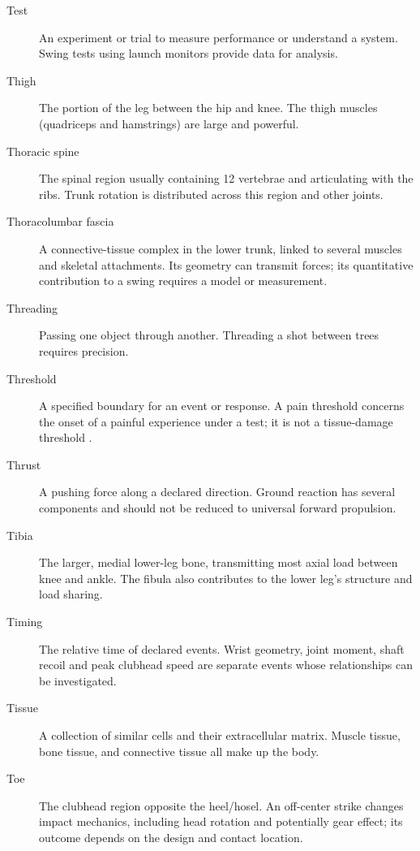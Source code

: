 \begin{description}
\item[Test] An experiment or trial to measure performance or understand a system. Swing tests using launch monitors provide data for analysis.

\item[Thigh] The portion of the leg between the hip and knee. The thigh muscles (quadriceps and hamstrings) are large and powerful.

\item[Thoracic spine] The spinal region usually containing 12 vertebrae and articulating with the ribs. Trunk rotation is distributed across this region and other joints.

\item[Thoracolumbar fascia] A connective-tissue complex in the lower trunk, linked to several muscles and skeletal attachments. Its geometry can transmit forces; its quantitative contribution to a swing requires a model or measurement.

\item[Threading] Passing one object through another. Threading a shot between trees requires precision.

\item[Threshold] A specified boundary for an event or response. A pain threshold concerns the onset of a painful experience under a test; it is not a tissue-damage threshold \citep{glossaryIASP}.

\item[Thrust] A pushing force along a declared direction. Ground reaction has several components and should not be reduced to universal forward propulsion.

\item[Tibia] The larger, medial lower-leg bone, transmitting most axial load between knee and ankle. The fibula also contributes to the lower leg's structure and load sharing.

\item[Timing] The relative time of declared events. Wrist geometry, joint moment, shaft recoil and peak clubhead speed are separate events whose relationships can be investigated.

\item[Tissue] A collection of similar cells and their extracellular matrix. Muscle tissue, bone tissue, and connective tissue all make up the body.

\item[Toe] The clubhead region opposite the heel/hosel. An off-center strike changes impact mechanics, including head rotation and potentially gear effect; its outcome depends on the design and contact location.


\end{description}

